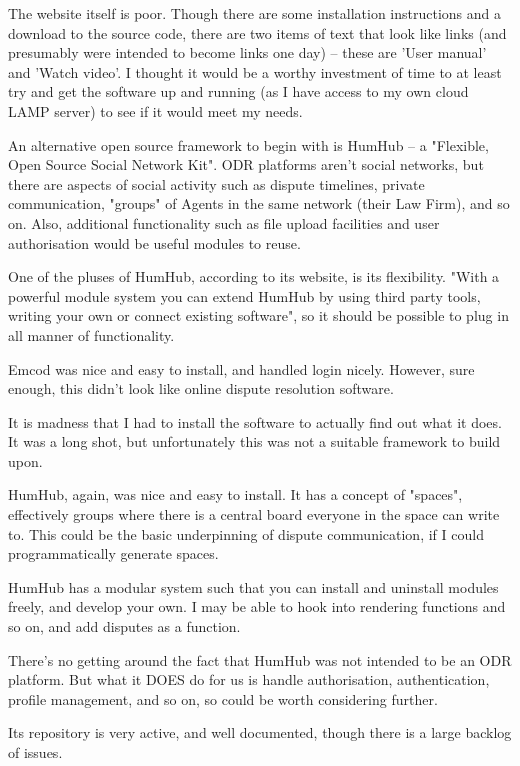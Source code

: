 The website itself is poor. Though there are some installation instructions and a download to the source code, there are two items of text that look like links (and presumably were intended to become links one day) – these are 'User manual' and 'Watch video'. I thought it would be a worthy investment of time to at least try and get the software up and running (as I have access to my own cloud LAMP server) to see if it would meet my needs.

An alternative open source framework to begin with is HumHub – a "Flexible, Open Source Social Network Kit". ODR platforms aren't social networks, but there are aspects of social activity such as dispute timelines, private communication, "groups" of Agents in the same network (their Law Firm), and so on. Also, additional functionality such as file upload facilities and user authorisation would be useful modules to reuse.

One of the pluses of HumHub, according to its website, is its flexibility. "With a powerful module system you can extend HumHub by using third party tools, writing your own or connect existing software", so it should be possible to plug in all manner of functionality.

Emcod was nice and easy to install, and handled login nicely. However, sure enough, this didn't look like online dispute resolution software.

It is madness that I had to install the software to actually find out what it does. It was a long shot, but unfortunately this was not a suitable framework to build upon.

HumHub, again, was nice and easy to install. It has a concept of "spaces", effectively groups where there is a central board everyone in the space can write to. This could be the basic underpinning of dispute communication, if I could programmatically generate spaces.

HumHub has a modular system such that you can install and uninstall modules freely, and develop your own. I may be able to hook into rendering functions and so on, and add disputes as a function.

There’s no getting around the fact that HumHub was not intended to be an ODR platform. But what it DOES do for us is handle authorisation, authentication, profile management, and so on, so could be worth considering further.

Its repository is very active, and well documented, though there is a large backlog of issues.

